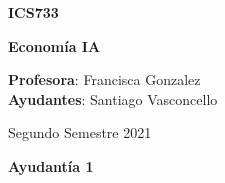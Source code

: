 \documentclass[spanish, 10pt]{article}
\begin{document}
\begin{center}

  \large{\textbf{ICS733}}

  \Large{\noindent \textbf{Economía IA}}

  \large{ \noindent \textbf{Profesora}: Francisca Gonzalez}\\

  \normalsize{\textbf{Ayudantes}: Santiago Vasconcello}

  \bigskip
  \bigskip
  \textmd{\large{Segundo Semestre 2021}}

  \bigskip

  \normalsize{\textbf{Ayudantía 1}}

\end{center}
\bigskip
\end{document}
